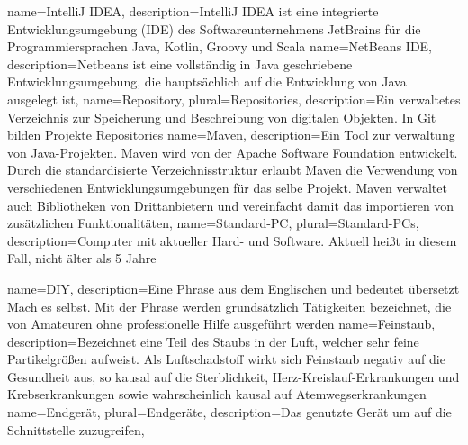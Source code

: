 {
	name=IntelliJ IDEA,
	description={IntelliJ IDEA ist eine integrierte Entwicklungsumgebung (IDE) des Softwareunternehmens JetBrains für die Programmiersprachen Java, Kotlin, Groovy und Scala}
}
{
	name=NetBeans IDE,
	description={Netbeans ist eine vollständig in Java geschriebene Entwicklungsumgebung, die hauptsächlich auf die Entwicklung von Java ausgelegt ist},
}
{
	name=Repository,
	plural=Repositories,
	description={Ein verwaltetes Verzeichnis zur Speicherung und Beschreibung von digitalen Objekten. In Git bilden Projekte Repositories}
}
{
	name=Maven,
	description={Ein Tool zur verwaltung von Java-Projekten. Maven wird von der Apache Software Foundation entwickelt. Durch die standardisierte Verzeichnisstruktur erlaubt Maven die Verwendung von verschiedenen Entwicklungsumgebungen für das selbe Projekt. Maven verwaltet auch Bibliotheken von Drittanbietern und vereinfacht damit das importieren von zusätzlichen Funktionalitäten},
}
{
	name=Standard-PC,
	plural=Standard-PCs,
	description={Computer mit aktueller Hard- und Software. Aktuell heißt in diesem Fall, nicht älter als 5 Jahre}
}

{
	name=DIY,
	description={Eine Phrase aus dem Englischen und bedeutet übersetzt Mach es selbst. Mit der Phrase werden grundsätzlich Tätigkeiten bezeichnet, die von Amateuren ohne professionelle Hilfe ausgeführt werden}
}
{
	name=Feinstaub,
	description={Bezeichnet eine Teil des Staubs in der Luft, welcher sehr feine Partikelgrößen aufweist. Als Luftschadstoff wirkt sich Feinstaub negativ auf die Gesundheit aus, so kausal auf die Sterblichkeit, Herz-Kreislauf-Erkrankungen und Krebserkrankungen sowie wahrscheinlich kausal auf Atemwegserkrankungen}
}
 {
	name=Endgerät,
	plural=Endgeräte,
    description={Das genutzte Gerät um auf die Schnittstelle zuzugreifen},
}

